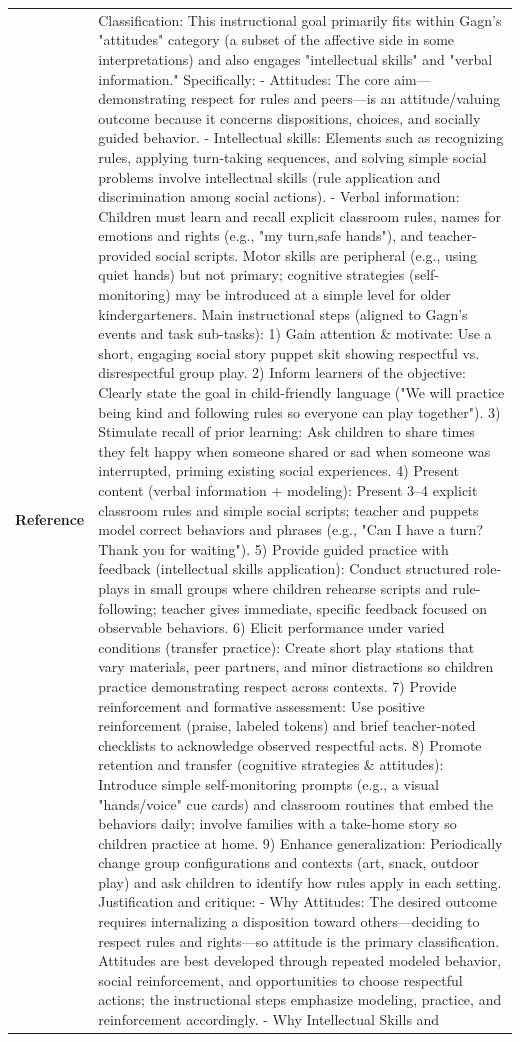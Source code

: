\begin{longtable}{@{}l p{12.5cm}@{}}
  \textbf{Reference} & Classification: This instructional goal primarily fits within Gagn's "attitudes" category (a subset of the affective side in some interpretations) and also engages "intellectual skills" and "verbal information." Specifically: - Attitudes: The core aim---demonstrating respect for rules and peers---is an attitude/valuing outcome because it concerns dispositions, choices, and socially guided behavior. - Intellectual skills: Elements such as recognizing rules, applying turn-taking sequences, and solving simple social problems involve intellectual skills (rule application and discrimination among social actions). - Verbal information: Children must learn and recall explicit classroom rules, names for emotions and rights (e.g., "my turn,safe hands"), and teacher-provided social scripts. Motor skills are peripheral (e.g., using quiet hands) but not primary; cognitive strategies (self-monitoring) may be introduced at a simple level for older kindergarteners. Main instructional steps (aligned to Gagn's events and task sub-tasks): 1) Gain attention \& motivate: Use a short, engaging social story puppet skit showing respectful vs. disrespectful group play. 2) Inform learners of the objective: Clearly state the goal in child-friendly language ("We will practice being kind and following rules so everyone can play together"). 3) Stimulate recall of prior learning: Ask children to share times they felt happy when someone shared or sad when someone was interrupted, priming existing social experiences. 4) Present content (verbal information + modeling): Present 3--4 explicit classroom rules and simple social scripts; teacher and puppets model correct behaviors and phrases (e.g., "Can I have a turn?Thank you for waiting"). 5) Provide guided practice with feedback (intellectual skills application): Conduct structured role-plays in small groups where children rehearse scripts and rule-following; teacher gives immediate, specific feedback focused on observable behaviors. 6) Elicit performance under varied conditions (transfer practice): Create short play stations that vary materials, peer partners, and minor distractions so children practice demonstrating respect across contexts. 7) Provide reinforcement and formative assessment: Use positive reinforcement (praise, labeled tokens) and brief teacher-noted checklists to acknowledge observed respectful acts. 8) Promote retention and transfer (cognitive strategies \& attitudes): Introduce simple self-monitoring prompts (e.g., a visual "hands/voice" cue cards) and classroom routines that embed the behaviors daily; involve families with a take-home story so children practice at home. 9) Enhance generalization: Periodically change group configurations and contexts (art, snack, outdoor play) and ask children to identify how rules apply in each setting. Justification and critique: - Why Attitudes: The desired outcome requires internalizing a disposition toward others---deciding to respect rules and rights---so attitude is the primary classification. Attitudes are best developed through repeated modeled behavior, social reinforcement, and opportunities to choose respectful actions; the instructional steps emphasize modeling, practice, and reinforcement accordingly. - Why Intellectual Skills and 
\end{longtable}
